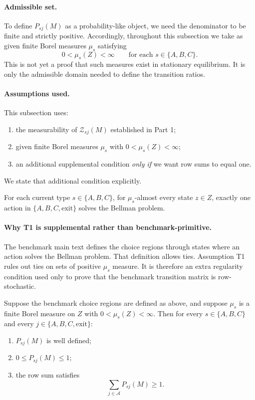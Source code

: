 \paragraph{Admissible set.}
To define $P_{sj}(M)$ as a probability-like object, we need the denominator to be finite and strictly positive. Accordingly, throughout this subsection we take as given finite Borel measures $\mu_s$ satisfying
\[
0<\mu_s(Z)<\infty
\qquad\text{for each }s\in\{A,B,C\}.
\]
This is not yet a proof that such measures exist in stationary equilibrium. It is only the admissible domain needed to define the transition ratios.

\paragraph{Assumptions used.}
This subsection uses:
\begin{enumerate}
    \item the measurability of $\mathcal Z_{sj}(M)$ established in Part 1;
    \item given finite Borel measures $\mu_s$ with $0<\mu_s(Z)<\infty$;
    \item an additional supplemental condition \emph{only if} we want row sums to equal one.
\end{enumerate}
We state that additional condition explicitly.

\begin{assumption}
For each current type $s\in\{A,B,C\}$, for $\mu_s$-almost every state $z\in Z$, exactly one action in $\{A,B,C,\mathrm{exit}\}$ solves the Bellman problem.
\end{assumption}

\paragraph{Why T1 is supplemental rather than benchmark-primitive.}
The benchmark main text defines the choice regions through states where an action solves the Bellman problem. That definition allows ties. Assumption T1 rules out ties on sets of positive $\mu_s$ measure. It is therefore an extra regularity condition used only to prove that the benchmark transition matrix is row-stochastic.

\begin{proposition}
Suppose the benchmark choice regions are defined as above, and suppose $\mu_s$ is a finite Borel measure on $Z$ with $0<\mu_s(Z)<\infty$. Then for every $s\in\{A,B,C\}$ and every $j\in\{A,B,C,\mathrm{exit}\}$:
\begin{enumerate}
    \item $P_{sj}(M)$ is well defined;
    \item $0\le P_{sj}(M)\le 1$;
    \item the row sum satisfies
    \[
    \sum_{j\in\mathcal A}P_{sj}(M)\ge 1.
    \]
\end{enumerate}
\end{proposition}

